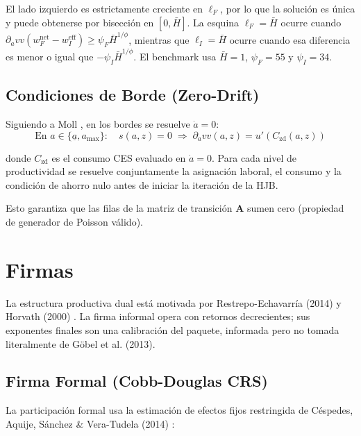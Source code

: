 \documentclass[12pt]{article}
\newcommand{\dVa}{\partial_a v}
\newcommand{\abar}{\underline{a}}
\begin{document}
El lado izquierdo es estrictamente creciente en $\ell_F$, por lo que la solución es única y puede obtenerse por bisección en $[0, \bar{H}]$. La esquina $\ell_F=\bar H$ ocurre cuando $\dVa v(w_F^{\mathrm{net}}-w_I^{\mathrm{eff}})\geq\psi_F\bar H^{1/\phi}$, mientras que $\ell_I=\bar H$ ocurre cuando esa diferencia es menor o igual que $-\psi_I\bar H^{1/\phi}$. El benchmark usa $\bar H=1$, $\psi_F=55$ y $\psi_I=34$.

\subsection{Condiciones de Borde (Zero-Drift)}

Siguiendo a Moll \cite{moll_labor}, en los bordes se resuelve $\dot{a}=0$:
\begin{equation}\label{eq:boundary}
\text{En } a \in \{\abar, a_{\max}\}: \quad s(a,z) = 0 \;\Longrightarrow\; \dVa v(a,z) = u'(C_{\text{zd}}(a,z))
\end{equation}

donde $C_{\text{zd}}$ es el consumo CES evaluado en $\dot{a}=0$. Para cada nivel de productividad se resuelve conjuntamente la asignación laboral, el consumo y la condición de ahorro nulo antes de iniciar la iteración de la HJB.

Esto garantiza que las filas de la matriz de transición $\mathbf{A}$ sumen cero (propiedad de generador de Poisson válido).

\section{Firmas}

La estructura productiva dual está motivada por Restrepo-Echavarría (2014) \cite{restrepo2014} y Horvath (2000) \cite{horvath2000}. La firma informal opera con retornos decrecientes; sus exponentes finales son una calibración del paquete, informada pero no tomada literalmente de Göbel et al. (2013).

\subsection{Firma Formal (Cobb-Douglas CRS)}

La participación formal usa la estimación de efectos fijos restringida de Céspedes, Aquije, Sánchez \& Vera-Tudela (2014) \cite{cespedes2014}:
\end{document}
